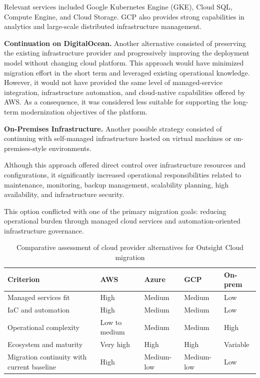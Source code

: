 Relevant services included Google Kubernetes Engine (GKE), Cloud SQL, Compute Engine, and Cloud Storage. GCP also provides strong capabilities in analytics and large-scale distributed infrastructure management.

\textbf{Continuation on DigitalOcean.}
Another alternative consisted of preserving the existing infrastructure provider and progressively improving the deployment model without changing cloud platform. This approach would have minimized migration effort in the short term and leveraged existing operational knowledge. However, it would not have provided the same level of managed-service integration, infrastructure automation, and cloud-native capabilities offered by AWS. As a consequence, it was considered less suitable for supporting the long-term modernization objectives of the platform.

\textbf{On-Premises Infrastructure.} Another possible strategy consisted of continuing with self-managed infrastructure hosted on virtual machines or on-premises-style environments.

Although this approach offered direct control over infrastructure resources and configurations, it significantly increased operational responsibilities related to maintenance, monitoring, backup management, scalability planning, high availability, and infrastructure security.

This option conflicted with one of the primary migration goals: reducing operational burden through managed cloud services and automation-oriented infrastructure governance.

\begin{table}[H]
\centering
\small
\caption{Comparative assessment of cloud provider alternatives for Outsight Cloud migration}
\label{tab:cloud-provider-comparison}
\begin{tabular}{|p{3.0cm}|p{2.2cm}|p{2.2cm}|p{2.2cm}|p{2.2cm}|}
\hline
\textbf{Criterion} & \textbf{AWS} & \textbf{Azure} & \textbf{GCP} & \textbf{On-prem} \\
\hline
Managed services fit & High & Medium & Medium & Low \\
\hline
IaC and automation & High & Medium & Medium & Low \\
\hline
Operational complexity & Low to medium & Medium & Medium & High \\
\hline
Ecosystem and maturity & Very high & High & High & Variable \\
\hline
Migration continuity with current baseline & High & Medium-low & Medium-low & Low \\
\hline
\end{tabular}
\normalsize
\end{table}


